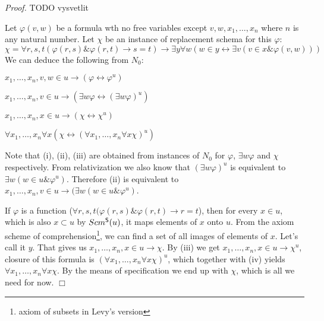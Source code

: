 \documentclass[12pt,a4paper]{article}
\newenvironment{proof}
{\noindent \textit{Proof.}}
{\hspace*{\fill} $\Box$}
\renewcommand{\iff}{\leftrightarrow}
\newcommand{\then}{\rightarrow}
\newcommand{\bce}{\begin{compactenum}}
\newcommand{\ece}{\end{compactenum}}
\begin{document}
\begin{proof}
TODO vysvetlit


Let $\varphi(v, w)$ be a formula wth no free variables except $v, w, x_1, \ldots, x_n$ where $n$ is any natural number.
Let $\chi$ be an instance of replacement schema for this $\varphi$:
\begin{equation}
\chi = \forall r, s, t(\varphi(r, s) \& \varphi(r, t) \then s = t) \then \exists y \forall w (w \in y \iff \exists v (v \in x \& \varphi(v, w)))
\end{equation}
\medskip
We can deduce the following from $N_0$: 
\bce[(i)]
\item $x_1, \ldots, x_n, v, w \in u \then (\varphi \iff \varphi^{u}) $
\item $x_1, \ldots, x_n, v \in u \then (\exists w \varphi \iff (\exists w \varphi)^{u})$
\item $x_1, \ldots, x_n, x \in u \then (\chi \iff \chi^{u})$
\item $\forall x_1, \ldots, x_n \forall x (\chi \iff (\forall x_1, \ldots, x_n \forall x \chi)^{u})$
\ece

Note that (i), (ii), (iii) are obtained from instances of $N_0$ for $\varphi$, $\exists w \varphi$ and $\chi$ respectively.  %
From relativization we also know that $(\exists w \varphi)^{u}$ is equivalent to $\exists w (w \in u \& \varphi^{u})$.
Therefore (ii) is equivalent to $x_1, \ldots, x_n, v \in u \then (\exists w (w \in u \& \varphi^{u})$. 

If $\varphi$ is a function ($ \forall r, s, t(\varphi(r, s) \& \varphi(r, t) \then r=t $), then for every $x \in u$, which is also $x \subset u$ by $Scm^{\sf{S}}(u)$,
it maps elements of $x$ onto $u$. From the axiom scheme of comprehension\footnote{axiom of subsets in Levy's version}, we can find a set of all images of elements of $x$. Let's call it $y$.
That gives us $x_1, \ldots, x_n, x \in u \then \chi$. By (iii) we get $x_1, \ldots, x_n, x \in u \then \chi^{u}$, closure of this formula is $(\forall x_1, \ldots, x_n \forall x \chi)^{u}$, 
which together with (iv) yields $\forall x_1, \ldots, x_n \forall x \chi$. By the means of specification we end up with $\chi$, which is all we need for now. 
\end{proof}


\end{document}
